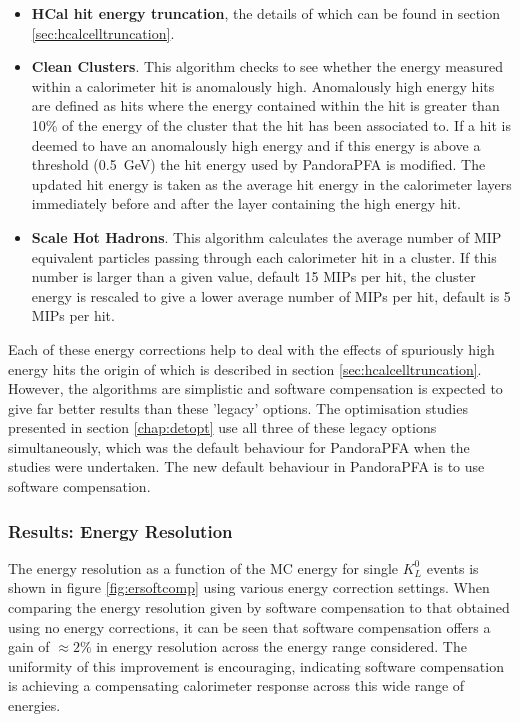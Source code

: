 \begin{itemize}
\item \textbf{HCal hit energy truncation}, the details of which can be found in section \ref{sec:hcalcelltruncation}.
\item \textbf{Clean Clusters}.  This algorithm checks to see whether the energy measured within a calorimeter hit is anomalously high.  Anomalously high energy hits are defined as hits where the energy contained within the hit is greater than 10\% of the energy of the cluster that the hit has been associated to.  If a hit is deemed to have an anomalously high energy and if this energy is above a threshold (0.5~GeV) the hit energy used by PandoraPFA is modified.  The updated hit energy is taken as the average hit energy in the calorimeter layers immediately before and after the layer containing the high energy hit.    
\item \textbf{Scale Hot Hadrons}.  This algorithm calculates the average number of MIP equivalent particles passing through each calorimeter hit in a cluster.  If this number is larger than a given value, default 15 MIPs per hit, the cluster energy is rescaled to give a lower average number of MIPs per hit, default is 5 MIPs per hit.  
\end{itemize}

Each of these energy corrections help to deal with the effects of spuriously high energy hits the origin of which is described in section \ref{sec:hcalcelltruncation}.  However, the algorithms are simplistic and software compensation is expected to give far better results than these 'legacy' options.  The optimisation studies presented in section \ref{chap:detopt} use all three of these legacy options simultaneously, which was the default behaviour for PandoraPFA when the studies were undertaken.  The new default behaviour in PandoraPFA is to use software compensation.


\subsubsection{Results: Energy Resolution}
\label{sec:softcomper}
The energy resolution as a function of the MC energy for single $K^{0}_{L}$ events is shown in figure \ref{fig:ersoftcomp} using various energy correction settings.  When comparing the energy resolution given by software compensation to that obtained using no energy corrections, it can be seen that software compensation offers a gain of $\approx 2 \%$ in energy resolution across the energy range considered.  The uniformity of this improvement is encouraging, indicating software compensation is achieving a compensating calorimeter response across this wide range of energies.  

